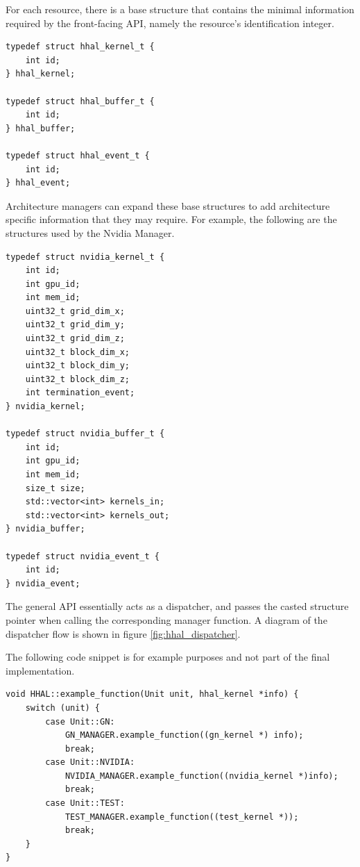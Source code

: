For each resource, there is a base structure that contains the minimal information required by the front-facing API, namely the resource's identification integer. 

\begin{lstlisting}[style=CStyle, caption=HHAL API - Base structures]
typedef struct hhal_kernel_t {
    int id;
} hhal_kernel;

typedef struct hhal_buffer_t {
    int id;
} hhal_buffer;

typedef struct hhal_event_t {
    int id;
} hhal_event;
\end{lstlisting}

Architecture managers can expand these base structures to add architecture specific information that they may require. For example, the following are the structures used by the Nvidia Manager.

\begin{lstlisting}[style=CStyle, label={HHAL:NvidiaStructs}, caption=HHAL Nvidia Manager - Extended structures]
typedef struct nvidia_kernel_t {
    int id;
    int gpu_id;
    int mem_id;
    uint32_t grid_dim_x;
    uint32_t grid_dim_y;
    uint32_t grid_dim_z;
    uint32_t block_dim_x;
    uint32_t block_dim_y;
    uint32_t block_dim_z;
    int termination_event;
} nvidia_kernel;

typedef struct nvidia_buffer_t {
    int id;
    int gpu_id;
    int mem_id;
    size_t size;
    std::vector<int> kernels_in;
    std::vector<int> kernels_out;
} nvidia_buffer;

typedef struct nvidia_event_t {
    int id;
} nvidia_event;
\end{lstlisting}

The general API essentially acts as a dispatcher, and passes the casted structure pointer when calling the corresponding manager function. A diagram of the dispatcher flow is shown in figure \ref{fig:hhal_dispatcher}.

The following code snippet is for example purposes and not part of the final implementation.

\begin{lstlisting}[style=CStyle, caption=HHAL API Example - Dispatching architecture-specific structures]
void HHAL::example_function(Unit unit, hhal_kernel *info) {
    switch (unit) {
        case Unit::GN:
            GN_MANAGER.example_function((gn_kernel *) info);
            break;
        case Unit::NVIDIA:
            NVIDIA_MANAGER.example_function((nvidia_kernel *)info);
            break;
        case Unit::TEST:
            TEST_MANAGER.example_function((test_kernel *));
            break;
    }
}
\end{lstlisting}

